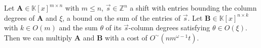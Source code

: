 \begin{thm}
\label{thm:multiplyUnbalancedMatrices} Let $\mathbf{A}\in\mathbb{K}\left[x\right]^{m\times n}$
with $m\le n$, $\vec{s}\in\mathbb{Z}^{n}$ a shift with entries bounding
the column degrees of $\mathbf{A}$ and $\xi$, a bound on the sum
of the entries of $\vec{s}$. Let $\mathbf{B}\in\mathbb{K}\left[x\right]^{n\times k}$
with $k\in O\left(m\right)$ and the sum $\theta$ of its $\vec{s}$-column
degrees satisfying $\theta\in O\left(\xi\right)$. Then we can multiply
$\mathbf{A}$ and $\mathbf{B}$ with a cost of $O^{\sim}(nm^{\omega-1}t)$.
\begin{comment}
\begin{proof}
For simplicity we assume $m$ is a power of 2, something which can
be achieved by appending zero rows to $\mathbf{F}$. Divide the matrix
$\mathbf{B}$ into $\log m$ column blocks according to the $\vec{s}$-column
degrees of its columns. Let 
\[
\mathbf{B}=\left[\begin{array}{cccc}
\mathbf{B}^{\left(\log m\right)} & \mathbf{B}^{\left(\log m-1\right)} & \cdots & \mathbf{B}^{\left(1\right)}\end{array}\right],
\]
 with $\mathbf{B}^{\left(\log m\right)}$, $\mathbf{B}^{\left(\log m-1\right)},$
$\mathbf{B}^{\left(\log m-2\right)}$, ... , $\mathbf{B}^{\left(2\right)}$,
$\mathbf{B}^{\left(1\right)}$ having $\vec{s}$-column degrees in
the range $\left[0,2\xi/m\right]$, $(2\xi/m,4\xi/m]$, $(4\xi/m,8\xi/m]$,
...,$(\xi/4,\xi/2]$, $(\xi/2,\theta]$, respectively. We will multiply
$\mathbf{A}$ with each $\mathbf{B}^{\left(i\right)}$ separately.


\end{comment}
\end{thm}

